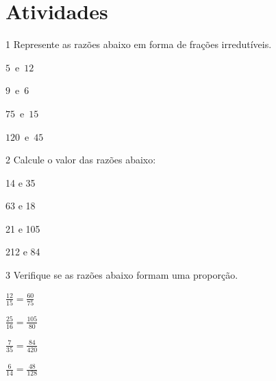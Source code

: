 \section*{Atividades}

\num{1} Represente as razões abaixo em forma de frações irredutíveis.

\begin{multicols}{2}
\begin{escolha}[itemsep=0pt]
\item $5$\ e\ $12$  \\
\item $9$\ e\ $6$  \\
\item $75$\ e\ $15$  \\
\item $120$\ e\ $45$  \\
\end{escolha}
\end{multicols}

\num{2} Calcule o valor das razões abaixo:
\begin{multicols}{2}
\begin{escolha}[itemsep=0pt]
\item 14 e 35  \\
\item 63 e 18  \\
\item 21 e 105  \\
\item 212 e 84  \\
\end{escolha}
\end{multicols}

\num{3} Verifique se as razões abaixo formam uma proporção.

\begin{escolha}[itemsep=0pt]
\item $\frac{12}{15} = \frac{60}{75}$  \\
\item $\frac{25}{16} = \frac{105}{80}$  \\
\item $\frac{7}{35} = \frac{84}{420}$  \\
\item $\frac{6}{14} = \frac{48}{128}$  \\
\end{escolha}

